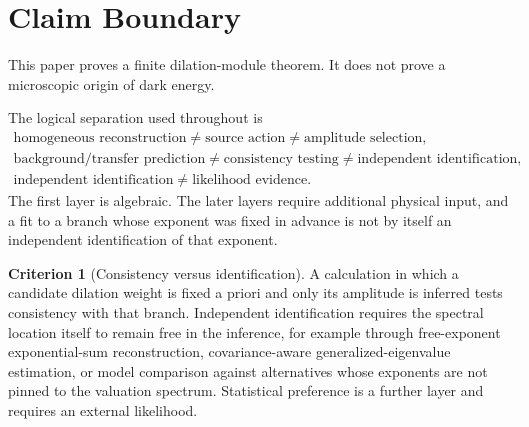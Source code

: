 \documentclass[aps,prd,preprint,onecolumn,nofootinbib,superscriptaddress,showkeys]{revtex4-2}
\numberwithin{equation}{section}
\theoremstyle{definition}
\newtheorem{criterion}{Criterion}[section]
\theoremstyle{plain}
\begin{document}
\begin{abstract}
We then evaluate the exact nulls on supplied pinned-CLASS and DESI DR2 BAO-only artifacts.  The executed source lift obeys \(\rho_X\propto a^{-1}\) with maximum residual \(1.88\times10^{-9}\), while the best-fit ledger satisfies the exact coefficient and Hankel/curvature diagnostics.  The BAO-only likelihood ratio gives \(q_X=1.364\) and one-sided \(p=0.121\), hence no detection.  Because \(w_X=-2/3\) is imposed in the executed lift, these numerical spectral recoveries are consistency tests, not independent identification of the valuation roots.  No microscopic source action or dimensional amplitude is derived.
\end{abstract}


\maketitle

\section{Claim Boundary}

This paper proves a finite dilation-module theorem.  It does not prove a microscopic origin of dark energy.

The logical separation used throughout is
\begin{equation}
\boxed{
\begin{gathered}
\text{homogeneous reconstruction}\neq\text{source action}\neq\text{amplitude selection},\\
\text{background/transfer prediction}\neq\text{consistency testing}\neq\text{independent identification},\\
\text{independent identification}\neq\text{likelihood evidence}.
\end{gathered}}
\end{equation}
The first layer is algebraic.  The later layers require additional physical input, and a fit to a branch whose exponent was fixed in advance is not by itself an independent identification of that exponent.

\begin{criterion}[Consistency versus identification]\label{crit:identification}
A calculation in which a candidate dilation weight is fixed a priori and only its amplitude is inferred tests consistency with that branch.  Independent identification requires the spectral location itself to remain free in the inference, for example through free-exponent exponential-sum reconstruction, covariance-aware generalized-eigenvalue estimation, or model comparison against alternatives whose exponents are not pinned to the valuation spectrum.  Statistical preference is a further layer and requires an external likelihood.
\end{criterion}
\end{document}
